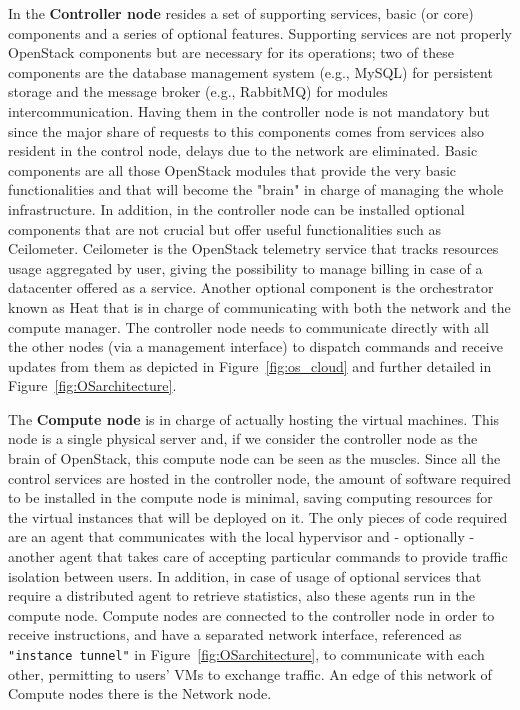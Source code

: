 In the \textbf{Controller node} resides a set of supporting services, basic (or core) components and a series of optional features.
Supporting services are not properly OpenStack components but are necessary for its operations; two of these components are the database management system (e.g., MySQL\cite{mysql}) for persistent storage and the message broker (e.g., RabbitMQ\cite{rabbitmq}) for modules intercommunication. Having them in the controller node is not mandatory but since the major share of requests to this components comes from services also resident in the control node, delays due to the network are eliminated.
Basic components are all those OpenStack modules that provide the very basic functionalities and that will become the "brain" in charge of managing the whole infrastructure.
In addition, in the controller node can be installed optional components that are not crucial but offer useful functionalities such as Ceilometer. Ceilometer is the OpenStack telemetry service that tracks resources usage aggregated by user, giving the possibility to manage billing in case of a datacenter offered as a service.
Another optional component is the orchestrator known as Heat that is in charge of communicating with both the network and the compute manager.
The controller node needs to communicate directly with all the other nodes (via a management interface) to dispatch commands and receive updates from them as depicted in Figure~\ref{fig:os_cloud} and further detailed in Figure~\ref{fig:OSarchitecture}.

The \textbf{Compute node} is in charge of actually hosting the virtual machines. This node is a single physical server and, if we consider the controller node as the brain of OpenStack, this compute node can be seen as the muscles. Since all the control services are hosted in the controller node, the amount of software required to be installed in the compute node is minimal, saving computing resources for the virtual instances that will be deployed on it. The only pieces of code required are an agent that communicates with the local hypervisor and - optionally - another agent that takes care of accepting particular commands to provide traffic isolation between users. In addition, in case of usage of optional services that require a distributed agent to retrieve statistics, also these agents run in the compute node.
Compute nodes are connected to the controller node in order to receive instructions, and have a separated network interface, referenced as \texttt{"instance tunnel"} in Figure~\ref{fig:OSarchitecture}, to communicate with each other, permitting to users' VMs to exchange traffic.
An edge of this network of Compute nodes there is the Network node.

